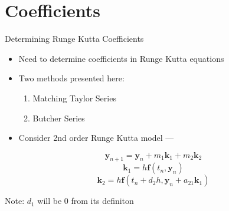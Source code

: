 \documentclass[serif]{beamer}
\begin{document}
\section{Coefficients}

\begin{frame}{Determining Runge Kutta Coefficients}
  \begin{itemize}
   \item<1->  Need to determine coefficients in Runge Kutta equations
   \item<1->  Two methods presented here:
   \begin{enumerate}
   \item<1->  Matching Taylor Series
   \item<1->  Butcher Series
   \end{enumerate}
  \vfill
  \item Consider 2nd order Runge Kutta model ---
  \end{itemize}
  \begin{equation}
    \nonumber \mathbf{y}_{n+1} = \mathbf{y}_n + m_1\mathbf{k}_1 + m_2\mathbf{k}_2
  \end{equation}
  \begin{equation}
    \nonumber \mathbf{k}_1 = h\mathbf{f}\left(t_n,\mathbf{y}_n\right)
  \end{equation}
  \begin{equation}
    \nonumber \mathbf{k}_2 = h\mathbf{f}\left(t_n + d_2h, \mathbf{y}_n + a_{21}\mathbf{k}_1\right)
  \end{equation}
  \vfill
  \begin{center}
    \alert{Note:} $d_1$ will be 0 from its definiton
  \end{center}
\end{frame}
\end{document}
